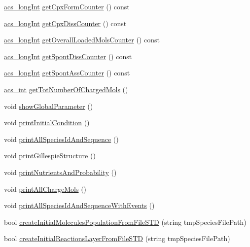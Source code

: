 \begin{DoxyCompactItemize}
\hyperlink{a00050_a19319d75f02db4308bc5c0026d98cd85}{acs\-\_\-long\-Int} \hyperlink{a00014_a5d72675f37c3936c58d27480613a9ab6}{get\-Cpx\-Form\-Counter} () const 
\item 
\hyperlink{a00050_a19319d75f02db4308bc5c0026d98cd85}{acs\-\_\-long\-Int} \hyperlink{a00014_abf2f63b22c52e17f6089f098651584b8}{get\-Cpx\-Diss\-Counter} () const 
\item 
\hyperlink{a00050_a19319d75f02db4308bc5c0026d98cd85}{acs\-\_\-long\-Int} \hyperlink{a00014_a75329459280bc79537a5c08883449a63}{get\-Overall\-Loaded\-Mols\-Counter} () const 
\item 
\hyperlink{a00050_a19319d75f02db4308bc5c0026d98cd85}{acs\-\_\-long\-Int} \hyperlink{a00014_a914378e80f148a4b24fc8e27ebb02198}{get\-Spont\-Diss\-Counter} () const 
\item 
\hyperlink{a00050_a19319d75f02db4308bc5c0026d98cd85}{acs\-\_\-long\-Int} \hyperlink{a00014_ab3c423ac69aac398c087cde1dcb0dccb}{get\-Spont\-Ass\-Counter} () const 
\item 
\hyperlink{a00050_a8d277355641a098190360234e2ebde35}{acs\-\_\-int} \hyperlink{a00014_aadb5c442d5c9d16a0d6b2e90715dda94}{get\-Tot\-Number\-Of\-Charged\-Mols} ()
\item 
void \hyperlink{a00014_af959a6b6a72cb6226fef7f0e7fab5c0c}{show\-Global\-Parameter} ()
\item 
void \hyperlink{a00014_a429c2529badaeda72e553f500b990e11}{print\-Initial\-Condition} ()
\item 
void \hyperlink{a00014_a48d8fd9d8d5c9c31f0b4af87c8cbd28f}{print\-All\-Species\-Id\-And\-Sequence} ()
\item 
void \hyperlink{a00014_aa3a18c59f6127c642603a98c1b3a2224}{print\-Gillespie\-Structure} ()
\item 
void \hyperlink{a00014_ad8fcefe5325382fb307627c7e8362ba8}{print\-Nutrients\-And\-Probability} ()
\item 
void \hyperlink{a00014_af579052ed051a2e3516218220d238303}{print\-All\-Charge\-Mols} ()
\item 
void \hyperlink{a00014_a3beddfc55f70a9cc855c3e3caaa7f188}{print\-All\-Species\-Id\-And\-Sequence\-With\-Events} ()
\item 
bool \hyperlink{a00014_aee77384e63261db28ef5677844bdbaf6}{create\-Initial\-Molecules\-Population\-From\-File\-S\-T\-D} (string tmp\-Species\-File\-Path)
\item 
bool \hyperlink{a00014_a2f181e0d3ad1e8062ba0a8c9358ebc58}{create\-Initial\-Reactions\-Layer\-From\-File\-S\-T\-D} (string tmp\-Species\-File\-Path)

\end{DoxyCompactItemize}
